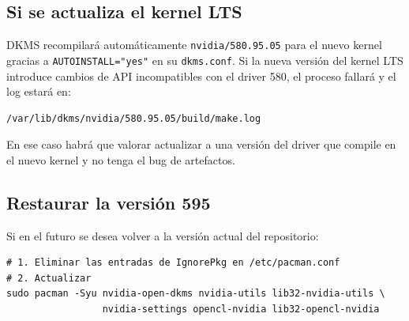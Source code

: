 \documentclass[12pt,a4paper]{article}
\begin{document}
\subsection{Si se actualiza el kernel LTS}

DKMS recompilará automáticamente \texttt{nvidia/580.95.05} para el nuevo
kernel gracias a \texttt{AUTOINSTALL="yes"} en su \texttt{dkms.conf}. Si la
nueva versión del kernel LTS introduce cambios de API incompatibles con el
driver 580, el proceso fallará y el log estará en:

\begin{lstlisting}[style=bash]
/var/lib/dkms/nvidia/580.95.05/build/make.log
\end{lstlisting}

En ese caso habrá que valorar actualizar a una versión del driver que
compile en el nuevo kernel y no tenga el bug de artefactos.

\subsection{Restaurar la versión 595}

Si en el futuro se desea volver a la versión actual del repositorio:

\begin{lstlisting}[style=bash]
# 1. Eliminar las entradas de IgnorePkg en /etc/pacman.conf
# 2. Actualizar
sudo pacman -Syu nvidia-open-dkms nvidia-utils lib32-nvidia-utils \
                 nvidia-settings opencl-nvidia lib32-opencl-nvidia
\end{lstlisting}
\end{document}
